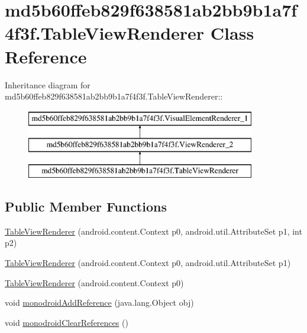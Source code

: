 \hypertarget{classmd5b60ffeb829f638581ab2bb9b1a7f4f3f_1_1_table_view_renderer}{
\section{md5b60ffeb829f638581ab2bb9b1a7f4f3f.TableViewRenderer Class Reference}
\label{classmd5b60ffeb829f638581ab2bb9b1a7f4f3f_1_1_table_view_renderer}
}
Inheritance diagram for md5b60ffeb829f638581ab2bb9b1a7f4f3f.TableViewRenderer::\begin{figure}[H]
\begin{center}
\leavevmode
\includegraphics[height=3cm]{classmd5b60ffeb829f638581ab2bb9b1a7f4f3f_1_1_table_view_renderer}
\end{center}
\end{figure}
\subsection*{Public Member Functions}
\begin{CompactItemize}
\item 
\hyperlink{classmd5b60ffeb829f638581ab2bb9b1a7f4f3f_1_1_table_view_renderer_68af3619c35003818e23669dc9cef59c}{TableViewRenderer} (android.content.Context p0, android.util.AttributeSet p1, int p2)
\item 
\hyperlink{classmd5b60ffeb829f638581ab2bb9b1a7f4f3f_1_1_table_view_renderer_993ff43e62fb704b89294265d31986e0}{TableViewRenderer} (android.content.Context p0, android.util.AttributeSet p1)
\item 
\hyperlink{classmd5b60ffeb829f638581ab2bb9b1a7f4f3f_1_1_table_view_renderer_74f51d5fe59d370780fb4fd9ad0475db}{TableViewRenderer} (android.content.Context p0)
\item 
void \hyperlink{classmd5b60ffeb829f638581ab2bb9b1a7f4f3f_1_1_table_view_renderer_f259e91ecf2a98fa15f6cfa21ba30c72}{monodroidAddReference} (java.lang.Object obj)
\item 
void \hyperlink{classmd5b60ffeb829f638581ab2bb9b1a7f4f3f_1_1_table_view_renderer_79caaf19be816b7fff9c8bc03b0cc805}{monodroidClearReferences} ()
\end{CompactItemize}
